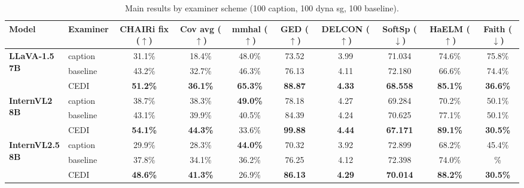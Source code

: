 
\begin{table}[t]
\centering
\tiny
\caption{Main results by examiner scheme (100 caption, 100 dyna sg, 100 baseline).}
\label{tab:main-exam}
\begin{tabular}{@{}l|l|cccccccc@{}}
\toprule
\textbf{Model} & \textbf{Examiner} & CHAIRi fix ($\uparrow$) & Cov avg ($\uparrow$) & mmhal ($\uparrow$) & GED ($\uparrow$) & DELCON ($\uparrow$) & SoftSp ($\downarrow$) & HaELM ($\uparrow$) & Faith ($\downarrow$) \\
\midrule
\multirow{3}{*}{\parbox{2.5cm}{\centering\textbf{LLaVA-1.5}\\ \textbf{7B}}} & caption & 31.1\% & 18.4\% & 48.0\% & 73.52 & 3.99 & 71.034 & 74.6\% & 75.8\% \\
 & baseline & 43.2\% & 32.7\% & 46.3\% & 76.13 &  4.11 & 72.180 & 66.6\% & 74.4\% \\
\rowcolor[HTML]{E6F2FF}
 \multicolumn{1}{l}{\cellcolor[HTML]{E6F2FF}} & CEDI & \textbf{51.2\%} & \textbf{36.1\%} & \textbf{65.3\%} & \textbf{88.87} & \textbf{4.33} & \textbf{68.558} & \textbf{85.1\%} & \textbf{36.6\%} \\
\midrule

\multirow{3}{*}{\parbox{2.5cm}{\centering\textbf{InternVL2}\\ \textbf{8B}}} & caption & 38.7\% & 38.3\% & \textbf{49.0\%} & 78.18 & 4.27 & 69.284 & 70.2\% & 50.1\% \\
 & baseline & 43.1\% & 39.9\% & 40.5\% & 84.39 &  4.24 & 70.625 & 77.1\% & 50.1\% \\
\rowcolor[HTML]{E6F2FF}
 \multicolumn{1}{l}{\cellcolor[HTML]{E6F2FF}} & CEDI & \textbf{54.1\%} & \textbf{44.3\%} & 33.6\% & \textbf{99.88} & \textbf{4.44} & \textbf{67.171} & \textbf{89.1\%} & \textbf{30.5\%} \\
\midrule

\multirow{3}{*}{\parbox{2.5cm}{\centering\textbf{InternVL2.5}\\ \textbf{8B}}} & caption & 29.9\% & 28.3\% & \textbf{44.0\%} & 70.32 & 3.92 & 72.899 & 68.2\% & 45.4\% \\
 & baseline & 37.8\% & 34.1\% & 36.2\% & 76.25 &  4.12 & 72.398 & 74.0\% & \% \\
\rowcolor[HTML]{E6F2FF}
 \multicolumn{1}{l}{\cellcolor[HTML]{E6F2FF}} & CEDI & \textbf{48.6\%} & \textbf{41.3\%} & 26.9\% & \textbf{86.13} & \textbf{4.29} & \textbf{70.014} & \textbf{88.2\%} & \textbf{30.5\%} \\
\midrule


\end{tabular}
\end{table}
